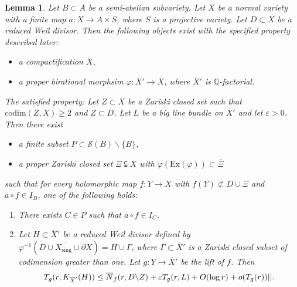 \documentclass[11pt,english]{smfart}
\theoremstyle{plain}
\newtheorem{lem}[thm]{Lemma}
\theoremstyle{definition}
\theoremstyle{remark}
\numberwithin{equation}{section}
\theoremstyle{plain}
\begin{document}
	\begin{lem}\label{cor:20220805}
		Let $B\subset A$ be a semi-abelian subvariety.
		Let $X$ be a normal variety with a finite map $a:X\to A\times S$, where $S$ is a projective variety.
		Let $D\subset X$ be a reduced Weil divisor.
		Then the following objects exist with the specified property described later: 
		\begin{itemize}
		\item a compactification $\overline{X}$,
		\item
		 a proper birational morphsim $\varphi:\overline{X}'\to \overline{X}$, where $\overline{X}'$ is $\mathbb Q$-factorial.
		 \end{itemize}
		 The satisfied property: 
		Let $Z\subset X$ be a Zariski closed set such that $\mathrm{codim}(Z,X)\geq 2$ and $Z\subset D$.
		Let $L$ be a big line bundle on $\overline{X}'$ and let $\varepsilon>0$.
		Then there exist  
		\begin{itemize}
			\item 
			a finite subset $P\subset \mathcal{S}(B)\backslash\{B\}$,
			\item
			a proper Zariski closed set $\Xi\subsetneqq X$ with $\varphi(\mathrm{Ex}(\varphi))\subset \overline{\Xi}$
		\end{itemize}
		such that for every holomorphic map $f:Y\to X$ with $f(Y)\not\subset D\cup\Xi$ and $a\circ f\in I_B$, one of the following holds:
		\begin{enumerate}
			\item
			There exists $C\in P$ such that $a\circ f\in I_C$.
			\item
			Let $H\subset \overline{X}'$ be a reduced Weil divisor defined by $\varphi^{-1}(\overline{D\cup X_{\mathrm{sing}}\cup \partial X})=H\cup \Gamma$, where $\Gamma\subset \overline{X}'$ is a Zariski closed subset of codimension greater than one.
			Let $g:Y\to \overline{X}'$ be the lift of $f$. 		
			Then
			\begin{equation*}
				T_g(r,K_{\overline{X}'}(H))
				\leq \overline{N}_f(r,D\backslash Z)+\varepsilon T_{g}(r,L)
				\\
				+O(\log r)+o(T_g(r))||.
			\end{equation*}
		\end{enumerate}
	\end{lem}
	
	
	
\end{document}

